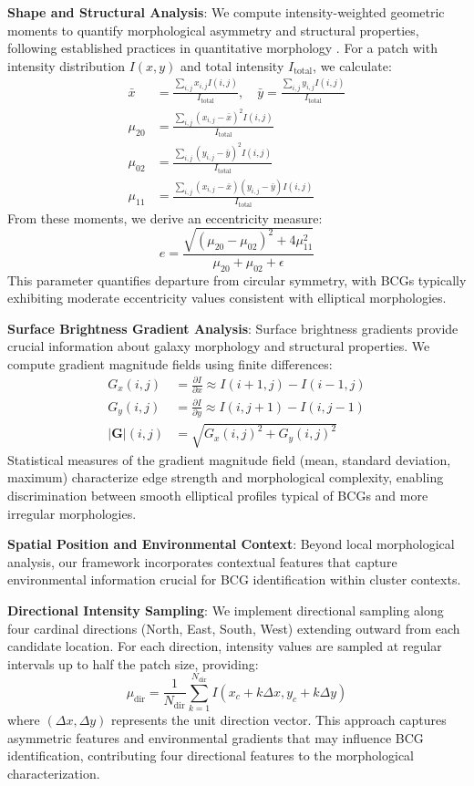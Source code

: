 \documentclass[twocolumn,10pt]{aastex631}
\begin{document}
\textbf{Shape and Structural Analysis}: We compute intensity-weighted geometric moments to quantify morphological asymmetry and structural properties, following established practices in quantitative morphology \citep{Hambleton2011}. For a patch with intensity distribution $I(x,y)$ and total intensity $I_{\text{total}}$, we calculate:
\begin{align}
\bar{x} &= \frac{\sum_{i,j} x_{i,j} I(i,j)}{I_{\text{total}}}, \quad \bar{y} = \frac{\sum_{i,j} y_{i,j} I(i,j)}{I_{\text{total}}} \\
\mu_{20} &= \frac{\sum_{i,j} (x_{i,j} - \bar{x})^2 I(i,j)}{I_{\text{total}}} \\
\mu_{02} &= \frac{\sum_{i,j} (y_{i,j} - \bar{y})^2 I(i,j)}{I_{\text{total}}} \\
\mu_{11} &= \frac{\sum_{i,j} (x_{i,j} - \bar{x})(y_{i,j} - \bar{y}) I(i,j)}{I_{\text{total}}}
\end{align}
From these moments, we derive an eccentricity measure:
\begin{equation}
e = \frac{\sqrt{(\mu_{20} - \mu_{02})^2 + 4\mu_{11}^2}}{\mu_{20} + \mu_{02} + \epsilon}
\end{equation}
This parameter quantifies departure from circular symmetry, with BCGs typically exhibiting moderate eccentricity values consistent with elliptical morphologies.

\textbf{Surface Brightness Gradient Analysis}: Surface brightness gradients provide crucial information about galaxy morphology and structural properties. We compute gradient magnitude fields using finite differences:
\begin{align}
G_x(i,j) &= \frac{\partial I}{\partial x} \approx I(i+1,j) - I(i-1,j) \\
G_y(i,j) &= \frac{\partial I}{\partial y} \approx I(i,j+1) - I(i,j-1) \\
|\mathbf{G}|(i,j) &= \sqrt{G_x(i,j)^2 + G_y(i,j)^2}
\end{align}
Statistical measures of the gradient magnitude field (mean, standard deviation, maximum) characterize edge strength and morphological complexity, enabling discrimination between smooth elliptical profiles typical of BCGs and more irregular morphologies.

\textbf{Spatial Position and Environmental Context}: Beyond local morphological analysis, our framework incorporates contextual features that capture environmental information crucial for BCG identification within cluster contexts.


\textbf{Directional Intensity Sampling}: We implement directional sampling along four cardinal directions (North, East, South, West) extending outward from each candidate location. For each direction, intensity values are sampled at regular intervals up to half the patch size, providing:
\begin{equation}
\mu_{\text{dir}} = \frac{1}{N_{\text{dir}}} \sum_{k=1}^{N_{\text{dir}}} I(x_c + k\Delta x, y_c + k\Delta y)
\end{equation}
where $(\Delta x, \Delta y)$ represents the unit direction vector. This approach captures asymmetric features and environmental gradients that may influence BCG identification, contributing four directional features to the morphological characterization.
\end{document}
